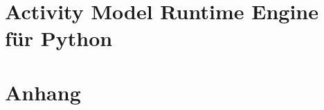 \documentclass[a4paper,12pt,oneside]{book}
\begin{document}
\part{Activity Model Runtime Engine für Python}








\part{Anhang}
%
%


\newpage

% 
% 
% 
\end{document}
